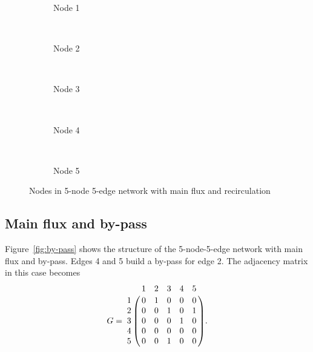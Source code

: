 \begin{figure}[htbp]
    \centering
    \begin{subfigure}[b]{0.48\textwidth}
        
        \caption{Node 1}
        \label{fig:recirculation1}
    \end{subfigure}
    ~
    \begin{subfigure}[b]{0.48\textwidth}
        
        \caption{Node 2}
        \label{fig:recirculation2}
    \end{subfigure}
    ~
    \begin{subfigure}[b]{0.48\textwidth}
        
        \caption{Node 3}
        \label{fig:recirculation3}
    \end{subfigure}
    ~
    \begin{subfigure}[b]{0.48\textwidth}
        
        \caption{Node 4}
        \label{fig:recirculation4}
    \end{subfigure}
    ~
    \begin{subfigure}[b]{0.48\textwidth}
        
        \caption{Node 5}
        \label{fig:recirculation5}
    \end{subfigure}
    \caption{Nodes in 5-node 5-edge network with main flux and recirculation}\label{fig:recirculation_nodes}
\end{figure}

\clearpage

\subsection{Main flux and by-pass}

Figure~\ref{fig:by-pass} shows the structure of the 5-node-5-edge network with main flux and by-pass. Edges 4 and 5 build a by-pass for edge 2. The adjacency matrix in this case becomes
\begin{equation}
    G = \bordermatrix{
        ~ & 1 & 2 & 3 & 4 & 5 \cr
        1 & 0 & 1 & 0 & 0 & 0 \cr
        2 & 0 & 0 & 1 & 0 & 1 \cr
        3 & 0 & 0 & 0 & 1 & 0 \cr
        4 & 0 & 0 & 0 & 0 & 0 \cr
        5 & 0 & 0 & 1 & 0 & 0 \cr}.
\end{equation}


